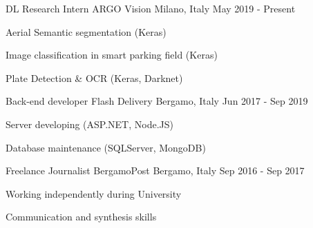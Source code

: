 

\begin{cventries}

  \cventry
    {DL Research Intern} %
    {ARGO Vision} %
    {Milano, Italy} %
    {May 2019 - Present} %
    {
      \begin{cvitems} %
      \item Aerial Semantic segmentation (Keras)
	  \item Image classification in smart parking field  (Keras)
	  \item Plate Detection \& OCR  (Keras, Darknet)
      \end{cvitems}
    }

  \cventry
    {Back-end developer} %
    {Flash Delivery} %
    {Bergamo, Italy} %
    {Jun 2017 - Sep 2019} %
    {
      \begin{cvitems} %
	    \item Server developing (ASP.NET, Node.JS)
		\item Database maintenance (SQLServer, MongoDB)
      \end{cvitems}
    }
  \cventry
    {Freelance Journalist} %
    {BergamoPost} %
    {Bergamo, Italy} %
    {Sep 2016 - Sep 2017} %
    {
      \begin{cvitems} %
			\item Working independently during University
			\item Communication and synthesis skills
      \end{cvitems}
    }

\end{cventries}
